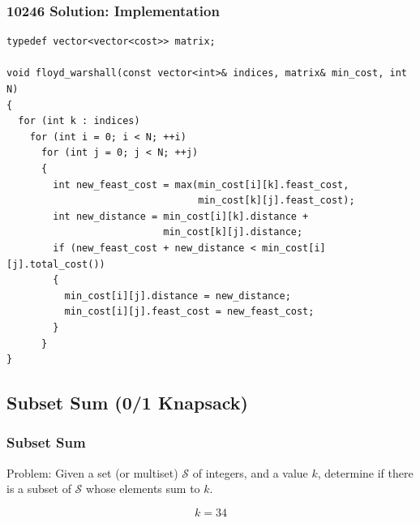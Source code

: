 \documentclass{beamer}
\begin{document}
\begin{frame}[containsverbatim]
\frametitle{10246 Solution: Implementation}

\scriptsize
\begin{lstlisting}
typedef vector<vector<cost>> matrix;

void floyd_warshall(const vector<int>& indices, matrix& min_cost, int N)
{
  for (int k : indices)
    for (int i = 0; i < N; ++i)
      for (int j = 0; j < N; ++j)
      {
        int new_feast_cost = max(min_cost[i][k].feast_cost,
                                 min_cost[k][j].feast_cost);
        int new_distance = min_cost[i][k].distance +
                           min_cost[k][j].distance;
        if (new_feast_cost + new_distance < min_cost[i][j].total_cost())
        {
          min_cost[i][j].distance = new_distance;
          min_cost[i][j].feast_cost = new_feast_cost;
        }
      }
}
\end{lstlisting}

\end{frame}

\fi

\subsection{Subset Sum (0/1 Knapsack)}

\begin{frame}%
\frametitle{Subset Sum}


\begin{mdframed}[style=exampledefault]
Problem: Given a set (or multiset) $\mathcal{S}$ of integers, and a value $k$, determine if there is a subset of $\mathcal{S}$
whose elements sum to $k$.
\end{mdframed}

\begin{overlayarea}{1\textwidth}{0.6\textheight}
\huge
$$
k = 34
$$
\Large
{}
\end{overlayarea}

\end{frame}
\end{document}
